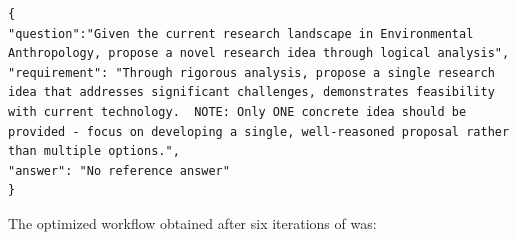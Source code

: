 \begin{tcolorbox}[title={\textbf{\small Idea data}}, boxrule=2pt, arc=0mm, breakable]\begin{verbatim}
{
"question":"Given the current research landscape in Environmental Anthropology, propose a novel research idea through logical analysis",
"requirement": "Through rigorous analysis, propose a single research idea that addresses significant challenges, demonstrates feasibility with current technology.  NOTE: Only ONE concrete idea should be provided - focus on developing a single, well-reasoned proposal rather than multiple options.",
"answer": "No reference answer"
}
\end{verbatim}
\end{tcolorbox}
The optimized workflow obtained after six iterations of \model was:

\label{appendix:Idea generation workflow}

